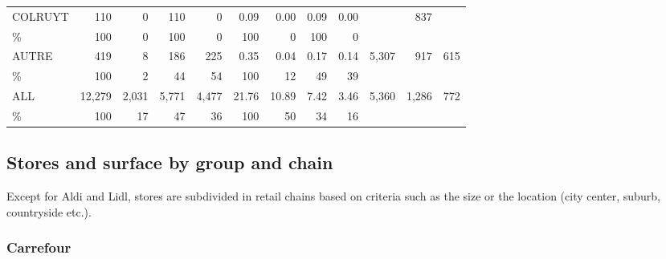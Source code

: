 \documentclass[11pt]{article}
\begin{document}
\begin{table}[H]
\begin{tabular}{l|rrrr|rrrr|rrr}
COLRUYT        &        110 &          0 &        110 &          0 &       0.09 &       0.00 &       0.09 &       0.00 &            &        837 &            \\
\%             &        100 &          0 &        100 &          0 &        100 &          0 &        100 &          0 &            &            &            \\
AUTRE          &        419 &          8 &        186 &        225 &       0.35 &       0.04 &       0.17 &       0.14 &      5,307 &        917 &        615 \\
\%             &        100 &          2 &         44 &         54 &        100 &         12 &         49 &         39 &            &            &            \\

\midrule
ALL            &     12,279 &      2,031 &      5,771 &      4,477 &      21.76 &      10.89 &       7.42 &       3.46 &      5,360 &      1,286 &        772 \\
\%             &        100 &         17 &         47 &         36 &        100 &         50 &         34 &         16 &            &            &            \\
\bottomrule
\end{tabular}

\end{table}

\subsection{Stores and surface by group and chain}

Except for Aldi and Lidl, stores are subdivided in retail chains based on criteria such as the size or the location (city center, suburb, countryside etc.).

\subsubsection{Carrefour}
\end{document}
